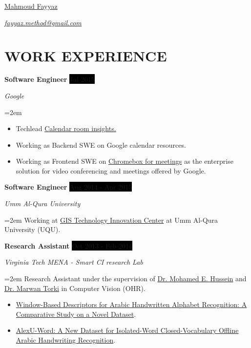 \documentclass[paper=a4,fontsize=11pt]{scrartcl} %
\newcommand{\sepspace}{\vspace*{0.5em}}		%
\newcommand{\MyName}[1]{ %
		\Huge \usefont{OT1}{phv}{b}{n} \hfill #1
		\par \normalsize \normalfont}
\newcommand{\MySlogan}[1]{ %
		\large \usefont{OT1}{phv}{m}{n}\hfill \textit{#1}
		\par \normalsize \normalfont}
\newcommand{\NewPart}[1]{\section*{\uppercase{#1}}}
\newcommand{\EducationEntry}[4]{
		\noindent \textbf{#1} \hfill      %
		\colorbox{Black}{%
			\parbox{6em}{%
			\hfill\color{White}#2}} \par  %
		\noindent \textit{#3} \par        %
		\noindent\hangindent=2em\hangafter=0 \small #4 %
		\normalsize \par}
\newcommand{\WorkEntry}[4]{				  %
		\noindent \textbf{#1} \hfill      %
		\colorbox{Black}{\color{White}#2} \par  %
		\noindent \textit{#3} \par              %
		\noindent\hangindent=2em\hangafter=0 \small #4 %
		\normalsize \par}
\begin{document}

\MyName{\href{http://phiiaz.github.io/Resume}{Mahmoud Fayyaz}}
\MySlogan{\href{mailto:fayyaz.method@gmail.com}{fayyaz.method@gmail.com}}

\sepspace

\NewPart{Work experience}{}

	\WorkEntry{Software Engineer}{Jul 2015}{Google}{
	\begin{itemize}
		\item Techlead \href{https://gsuiteupdates.googleblog.com/2018/08/manage-meeting-rooms-efficiently.html}{\color{blue}Calendar room insights.}
		\item Working as Backend SWE on Google calendar resources.
		\item Working as Frontend SWE on \href{https://www.google.se/work/chrome/devices/for-meetings/}{\color{blue}Chromebox for meetings} as the enterprise solution for video conferencing and meetings offered by Google.
	\end{itemize}}
\sepspace

	\WorkEntry{Software Engineer}{Aug 2014 - Apr 2015}{Umm Al-Qura University}{Working at \href{http://www.gistic.org/}{\color{blue}GIS Technology Innovation Center} at Umm Al-Qura University (UQU).}

	\WorkEntry{Research Assistant}{Oct 2013 - Feb 2014}{Virginia Tech MENA - Smart CI research Lab}{Research Assistant under the supervision of \href{http://scholar.google.com/citations?user=jCUt0o0AAAAJ&hl=en}{\color{blue}Dr. Mohamed E. Hussein} and \href{http://scholar.google.com/citations?user=aYLNZT4AAAAJ&hl=en}{\color{blue}Dr. Marwan Torki} in Computer Vision (OHR).
	\begin{itemize}
		\item \href{http://arxiv.org/abs/1411.3519}{\color{blue}Window-Based Descriptors for Arabic Handwritten Alphabet Recognition: A Comparative Study on a Novel Dataset}.
		\item \href{http://arxiv.org/abs/1411.4670}{\color{blue}AlexU-Word: A New Dataset for Isolated-Word Closed-Vocabulary Offline Arabic Handwriting Recognition}.
	\end{itemize}}
\end{document}
